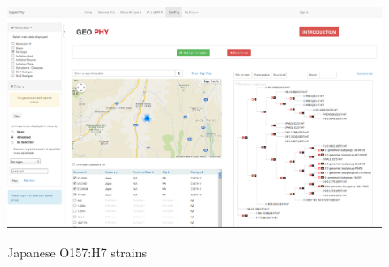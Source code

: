 \documentclass[doublespacing, linenumbers]{bmcart}
\begin{document}
\begin{backmatter}
\begin{figure}[h!]
  \caption{Japanese O157:H7 strains}
  \includegraphics[width=0.9\columnwidth]{images/geophy_o157.png}
  \label{fig:geophy}
\end{figure}







\end{backmatter}
\end{document}
